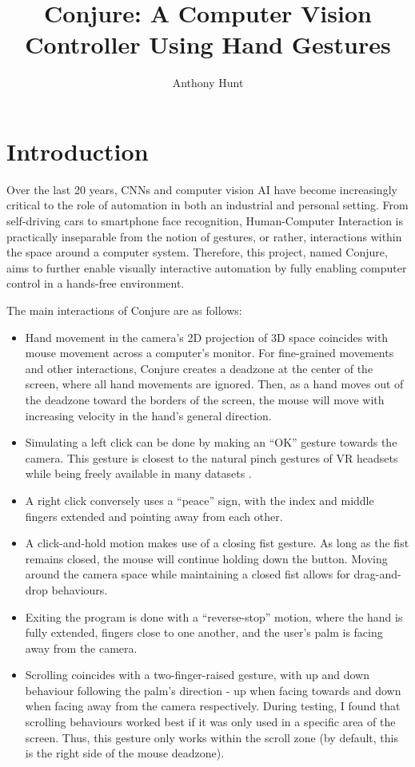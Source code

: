 \documentclass{article}
\title{Conjure: A Computer Vision Controller Using Hand Gestures}
\author{Anthony Hunt}
\begin{document}
\maketitle

\section{Introduction}
Over the last 20 years, CNNs and computer vision AI have become increasingly critical to the role of automation in both an industrial and personal setting. From self-driving cars to smartphone face recognition, Human-Computer Interaction is practically inseparable from the notion of gestures, or rather, interactions within the space around a computer system. Therefore, this project, named Conjure, aims to further enable visually interactive automation by fully enabling computer control in a hands-free environment.

The main interactions of Conjure are as follows:
\begin{itemize}
    \item Hand movement in the camera's 2D projection of 3D space coincides with mouse movement across a computer's monitor. For fine-grained movements and other interactions, Conjure creates a deadzone at the center of the screen, where all hand movements are ignored. Then, as a hand moves out of the deadzone toward the borders of the screen, the mouse will move with increasing velocity in the hand's general direction.
    \item Simulating a left click can be done by making an ``OK'' gesture towards the camera. This gesture is closest to the natural pinch gestures of VR headsets while being freely available in many datasets \cite{Alexander_2024, nuzhdin2024hagridv21mimagesstatic, zimmermann2017learningestimate3dhand, gesture_recognizer}.
    \item A right click conversely uses a ``peace'' sign, with the index and middle fingers extended and pointing away from each other.
    \item A click-and-hold motion makes use of a closing fist gesture. As long as the fist remains closed, the mouse will continue holding down the button. Moving around the camera space while maintaining a closed fist allows for drag-and-drop behaviours.
    \item Exiting the program is done with a ``reverse-stop'' motion, where the hand is fully extended, fingers close to one another, and the user's palm is facing away from the camera.
    \item Scrolling coincides with a two-finger-raised gesture, with up and down behaviour following the palm's direction - up when facing towards and down when facing away from the camera respectively. During testing, I found that scrolling behaviours worked best if it was only used in a specific area of the screen. Thus, this gesture only works within the scroll zone (by default, this is the right side of the mouse deadzone).
\end{itemize}
\end{document}
